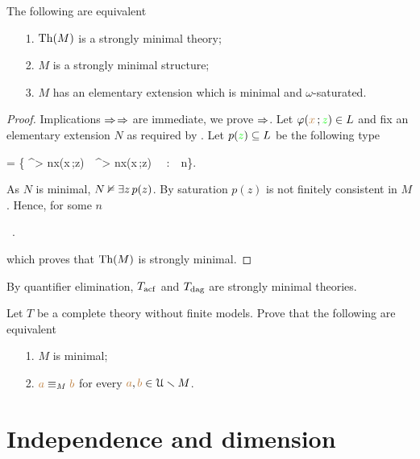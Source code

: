 \begin{proposition}\label{prop_fmequivalenzadefinizioni}
The following are equivalent
\begin{itemize}
\item[1.] $\textrm{Th}(M)$ is a strongly minimal theory;
\item[2.] $M$ is a strongly minimal structure; 
\item[3.] $M$ has an elementary extension which is minimal and $\omega$-saturated.
\end{itemize}
\end{proposition}
\begin{proof}
Implications $\Rightarrow$$\Rightarrow$ are immediate, we prove $\Rightarrow$.
Let $\varphi({\color{brown} x}\,;{\color{green} z})\in L$ and fix an elementary extension $N$ as required by .
Let $p({\color{green} z})\subseteq L$ be the following type

{=}
{\Big\{ \E^{> n}{\mr x}\;\phi({\mr x}\,;{\gr z})\ \wedge\ \E^{> n}{\mr x}\;\neg\phi({\mr x}\,;{\gr z}) \ \ :\ \ n\in\omega\Big\}.}

As $N$ is minimal, $N\nvDash \exists z\,p(z)$.
By saturation $p(z)$ is not finitely consistent in $M$.
Hence, for some $n$ 

{\models}
{\ .}

which proves that $\textrm{Th}(M)$ is strongly minimal.
\end{proof}

By quantifier elimination, $T_{\rm acf}$ and $T_{\rm dag}$ are strongly minimal theories.

\begin{exercise}
Let $T$ be a complete theory without finite models.
Prove that the following are equivalent
\begin{itemize}
\item[1.] $M$ is minimal;
\item[2.] ${\color{brown} a}\equiv_M{\color{brown} b}$ for every ${\color{brown} a}, {\color{brown} b}\in \EuScript U\smallsetminus M$.\QED
\end{itemize}
\end{exercise}



\section{Independence and dimension}
\def\medrel#1{\parbox[t]{5ex}{$\displaystyle\hfil #1$}}
\def\ceq#1#2#3{\parbox{35ex}{$\displaystyle #1$}\medrel{#2}$\displaystyle  #3$}


